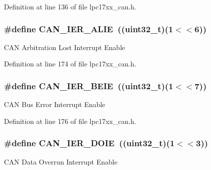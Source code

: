 \-Definition at line 136 of file lpc17xx\-\_\-can.\-h.

\hypertarget{group___c_a_n___private___macros_ga71c94a127f0774689febf52d4e08f974}{
\subsubsection[{\-C\-A\-N\-\_\-\-I\-E\-R\-\_\-\-A\-L\-I\-E}]{\setlength{\rightskip}{0pt plus 5cm}\#define {\bf \-C\-A\-N\-\_\-\-I\-E\-R\-\_\-\-A\-L\-I\-E}~((uint32\-\_\-t)(1$<$$<$6))}}\label{group___c_a_n___private___macros_ga71c94a127f0774689febf52d4e08f974}
\-C\-A\-N \-Arbitration \-Lost \-Interrupt \-Enable 

\-Definition at line 174 of file lpc17xx\-\_\-can.\-h.

\hypertarget{group___c_a_n___private___macros_ga9f2bbfc38e14781668ae928252b3639d}{
\subsubsection[{\-C\-A\-N\-\_\-\-I\-E\-R\-\_\-\-B\-E\-I\-E}]{\setlength{\rightskip}{0pt plus 5cm}\#define {\bf \-C\-A\-N\-\_\-\-I\-E\-R\-\_\-\-B\-E\-I\-E}~((uint32\-\_\-t)(1$<$$<$7))}}\label{group___c_a_n___private___macros_ga9f2bbfc38e14781668ae928252b3639d}
\-C\-A\-N \-Bus \-Error \-Interrupt \-Enable 

\-Definition at line 176 of file lpc17xx\-\_\-can.\-h.

\hypertarget{group___c_a_n___private___macros_ga0040248415efe4811e416b4265873a70}{
\subsubsection[{\-C\-A\-N\-\_\-\-I\-E\-R\-\_\-\-D\-O\-I\-E}]{\setlength{\rightskip}{0pt plus 5cm}\#define {\bf \-C\-A\-N\-\_\-\-I\-E\-R\-\_\-\-D\-O\-I\-E}~((uint32\-\_\-t)(1$<$$<$3))}}\label{group___c_a_n___private___macros_ga0040248415efe4811e416b4265873a70}
\-C\-A\-N \-Data \-Overrun \-Interrupt \-Enable 

